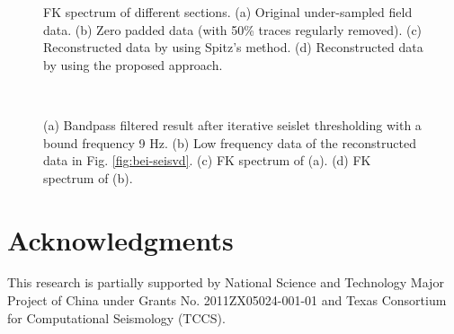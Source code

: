 \begin{figure*}[ht!]
  \centering
	\caption{FK spectrum of different sections. (a) Original under-sampled field data. (b) Zero padded data (with 50\% traces regularly removed). (c) Reconstructed data by using Spitz's method. (d) Reconstructed data by using the proposed approach.  }
   \label{fig:fk-bei,fk-bei-zero,fk-bei-fx,fk-bei-seisvd}
\end{figure*}


\begin{figure}[htb!]
  \centering
  \\
	\caption{(a) Bandpass filtered result after iterative seislet thresholding with a bound frequency 9 Hz. (b) Low frequency data of the reconstructed data in Fig. \ref{fig:bei-seisvd}. (c) FK spectrum of (a). (d) FK spectrum of (b).  }
   \label{fig:bei-seis-bp,bei-dif-bp,fk-bei-seis-bp,fk-dif-bp}
\end{figure}


\section{Acknowledgments}
This research is partially supported by National Science and Technology Major Project of China under Grants No. 2011ZX05024-001-01 and Texas Consortium for Computational Seismology (TCCS). %










